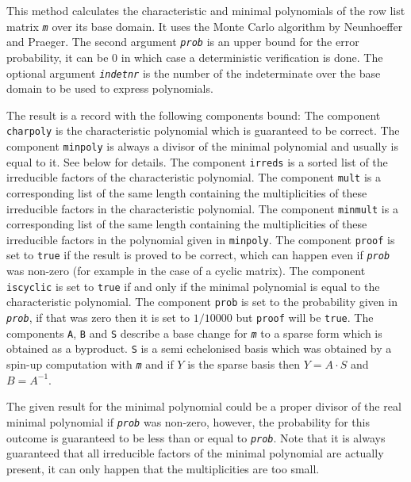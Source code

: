 \documentclass[a4paper,11pt]{report}
\begin{document}
{{{ This method calculates the characteristic and minimal polynomials of the row
list matrix \mbox{\texttt{\mdseries\slshape m}} over its base domain. It uses the Monte Carlo algorithm by Neunhoeffer and
Praeger. The second argument \mbox{\texttt{\mdseries\slshape prob}} is an upper bound for the error probability, it can be $0$ in which case a deterministic verification is done. The optional argument \mbox{\texttt{\mdseries\slshape indetnr}} is the number of the indeterminate over the base domain to be used to express
polynomials. 

 The result is a record with the following components bound: The component \texttt{charpoly} is the characteristic polynomial which is guaranteed to be correct. The
component \texttt{minpoly} is always a divisor of the minimal polynomial and usually is equal to it. See
below for details. The component \texttt{irreds} is a sorted list of the irreducible factors of the characteristic polynomial.
The component \texttt{mult} is a corresponding list of the same length containing the multiplicities of
these irreducible factors in the characteristic polynomial. The component \texttt{minmult} is a corresponding list of the same length containing the multiplicities of
these irreducible factors in the polynomial given in \texttt{minpoly}. The component \texttt{proof} is set to \texttt{true} if the result is proved to be correct, which can happen even if \mbox{\texttt{\mdseries\slshape prob}} was non-zero (for example in the case of a cyclic matrix). The component \texttt{iscyclic} is set to \texttt{true} if and only if the minimal polynomial is equal to the characteristic
polynomial. The component \texttt{prob} is set to the probability given in \mbox{\texttt{\mdseries\slshape prob}}, if that was zero then it is set to $1/10000$ but \texttt{proof} will be \texttt{true}. The components \texttt{A}, \texttt{B} and \texttt{S} describe a base change for \mbox{\texttt{\mdseries\slshape m}} to a sparse form which is obtained as a byproduct. \texttt{S} is a semi echelonised basis which was obtained by a spin-up computation with \mbox{\texttt{\mdseries\slshape m}} and if $Y$ is the sparse basis then $Y = A \cdot S$ and $B=A^{-1}$. 

The given result for the minimal polynomial could be a proper divisor of the
real minimal polynomial if \mbox{\texttt{\mdseries\slshape prob}} was non-zero, however, the probability for this outcome is guaranteed to be
less than or equal to \mbox{\texttt{\mdseries\slshape prob}}. Note that it is always guaranteed that all irreducible factors of the
minimal polynomial are actually present, it can only happen that the
multiplicities are too small. }

 }

  }
\end{document}
